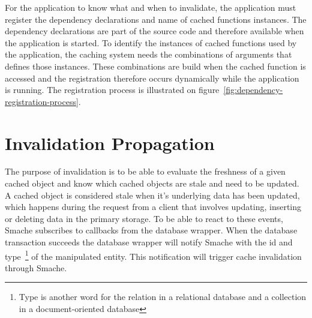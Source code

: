 
For the application to know what and when to invalidate, the application must register the dependency declarations and name of cached functions instances. The dependency declarations are part of the source code and therefore available when the application is started. To identify the instances of cached functions used by the application, the caching system needs the combinations of arguments that defines those instances. These combinations are build when the cached function is accessed and the registration therefore occurs dynamically while the application is running. The registration process is illustrated on figure~\ref{fig:dependency-registration-process}.

\begin{figure*}[ht!]
  \centering
  \caption{The flow in which the cached objects are registered}
  \label{fig:dependency-registration-process}
\end{figure*}




\section{Invalidation Propagation}
\label{sec:invalidation-propagation}

The purpose of invalidation is to be able to evaluate the freshness of a given cached object and know which cached objects are stale and need to be updated. A cached object is considered stale when it's underlying data has been updated, which happens during the request from a client that involves updating, inserting or deleting data in the primary storage. To be able to react to these events, Smache subscribes to callbacks from the database wrapper. When the database transaction succeeds the database wrapper will notify Smache with the id and type~\footnote{Type is another word for the relation in a relational database and a collection in a document-oriented database} of the manipulated entity. This notification will trigger cache invalidation through Smache.

